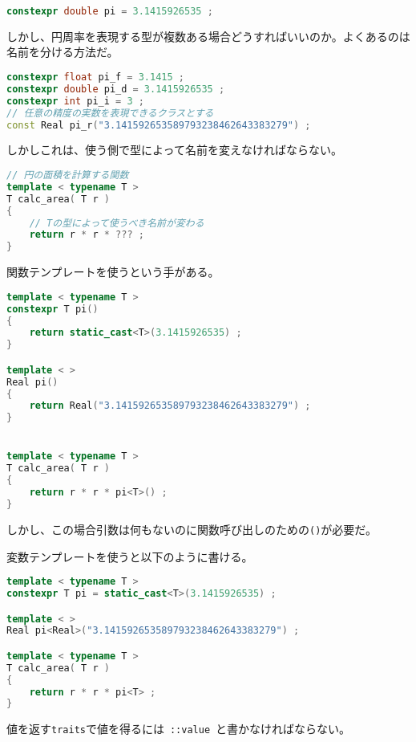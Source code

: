 \begin{lstlisting}[language=C++]
constexpr double pi = 3.1415926535 ;
\end{lstlisting}

しかし、円周率を表現する型が複数ある場合どうすればいいのか。よくあるのは名前を分ける方法だ。

\begin{lstlisting}[language=C++]
constexpr float pi_f = 3.1415 ;
constexpr double pi_d = 3.1415926535 ;
constexpr int pi_i = 3 ;
// 任意の精度の実数を表現できるクラスとする
const Real pi_r("3.141592653589793238462643383279") ;
\end{lstlisting}

しかしこれは、使う側で型によって名前を変えなければならない。

\begin{lstlisting}[language=C++]
// 円の面積を計算する関数
template < typename T >
T calc_area( T r )
{
    // Tの型によって使うべき名前が変わる
    return r * r * ??? ;
}
\end{lstlisting}

関数テンプレートを使うという手がある。

\begin{lstlisting}[language=C++]
template < typename T >
constexpr T pi()
{
    return static_cast<T>(3.1415926535) ;
}

template < >
Real pi()
{
    return Real("3.141592653589793238462643383279") ;
}


template < typename T >
T calc_area( T r )
{
    return r * r * pi<T>() ;
}
\end{lstlisting}

しかし、この場合引数は何もないのに関数呼び出しのための\lstinline!()!が必要だ。

変数テンプレートを使うと以下のように書ける。

\begin{lstlisting}[language=C++]
template < typename T >
constexpr T pi = static_cast<T>(3.1415926535) ;

template < >
Real pi<Real>("3.141592653589793238462643383279") ;

template < typename T >
T calc_area( T r )
{
    return r * r * pi<T> ;
}
\end{lstlisting}


%

値を返す\lstinline!traits!で値を得るには~\lstinline!::value!~と書かなければならない。

